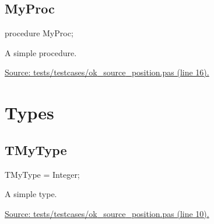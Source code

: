 \documentclass{report}
\newif\ifpdf
\begin{document}
\subsection*{MyProc}
\fi
\label{ok_source_position-MyProc}
\begin{list}{}{
\setlength{\itemindent}{0cm}
\setlength{\listparindent}{0cm}
\setlength{\leftmargin}{\evensidemargin}
\addtolength{\leftmargin}{\tmplength}
\settowidth{\labelsep}{X}
\addtolength{\leftmargin}{\labelsep}
\setlength{\labelwidth}{\tmplength}
}
\item[\textbf{Declaration}\hfill]
\ifpdf
\begin{flushleft}
\fi
\begin{ttfamily}
procedure MyProc;\end{ttfamily}

\ifpdf
\end{flushleft}
\fi

\par
\item[\textbf{Description}]
A simple procedure.\par
\href{https://github.com/pasdoc/pasdoc/blob/master/tests/testcases/ok_source_position.pas#L16}{Source: tests/testcases/ok{\_}source{\_}position.pas (line 16).}

\end{list}
\section{Types}
\ifpdf
\subsection*{\large{\textbf{TMyType}}\normalsize\hspace{1ex}\hrulefill}
\else
\subsection*{TMyType}
\fi
\label{ok_source_position-TMyType}
\begin{list}{}{
\setlength{\itemindent}{0cm}
\setlength{\listparindent}{0cm}
\setlength{\leftmargin}{\evensidemargin}
\addtolength{\leftmargin}{\tmplength}
\settowidth{\labelsep}{X}
\addtolength{\leftmargin}{\labelsep}
\setlength{\labelwidth}{\tmplength}
}
\item[\textbf{Declaration}\hfill]
\ifpdf
\begin{flushleft}
\fi
\begin{ttfamily}
TMyType = Integer;\end{ttfamily}

\ifpdf
\end{flushleft}
\fi

\par
\item[\textbf{Description}]
A simple type.\par
\href{https://github.com/pasdoc/pasdoc/blob/master/tests/testcases/ok_source_position.pas#L10}{Source: tests/testcases/ok{\_}source{\_}position.pas (line 10).}

\end{list}
\ifpdf
\end{document}
